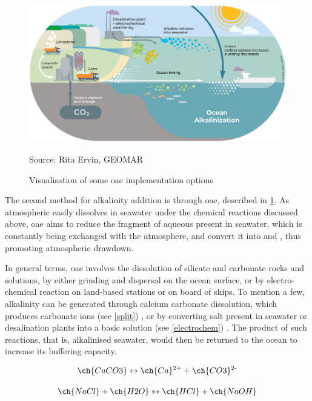 \begin{figure}[H]
\caption[Visualisation of some \texorpdfstring{OAE}{OAE} implementation options]{Visualisation of some \ac{oae} implementation options}
\label{oae}
\centering
\includegraphics[width=12cm]{fig/1_Introduction/alkalinization_210325.jpg}

\scriptsize Source: Rita Ervin, GEOMAR
\end{figure}

The second method for alkalinity addition is through \acl{oae}, described in \cref{oae}. As atmospheric  easily dissolves in seawater under the chemical reactions discussed above, \ac{oae} aims to reduce the fragment of aqueous  present in seawater, which is constantly being exchanged with the atmosphere, and convert it into  and , thus promoting atmospheric  drawdown. 

In general terms, \ac{oae} involves the dissolution of silicate and carbonate rocks and solutions, by either grinding and dispersal on the ocean surface, or by electro-chemical reaction on land-based stations or on board of ships. To mention a few, alkalinity can be generated through calcium carbonate dissolution, which produces carbonate ions (see \ref{split}) \citep{rau2008electrochemical}, or by converting salt present in seawater or desalination plants into a basic solution (see \ref{electrochem}) \citep{shaw2022understanding}. The product of such reactions, that is, alkalinised seawater, would then be returned to the ocean to increase its buffering capacity.

\begin{center}

\begin{equation}
\label{split}
\ch{CaCO3} \leftrightarrow \ch{Ca}\textsuperscript{2+} + \ch{CO3}\textsuperscript{2-}
\end{equation}

\begin{equation}
\label{electrochem}
\ch{NaCl} + \ch{H2O} \leftrightarrow \ch{HCl} + \ch{NaOH}
\end{equation}

\end{center}

